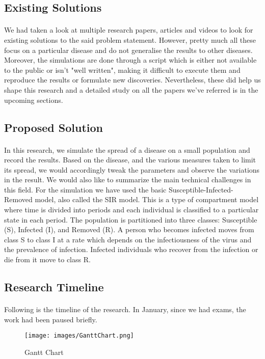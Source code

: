 \documentclass[12pt, a4paper]{extarticle}
\begin{document}
        \subsection{Existing Solutions}
            \paragraph{} We had taken a look at multiple research papers, articles and videos to look for existing solutions to the said problem statement. However, pretty much all these focus on a particular disease and do not generalise the results to other diseases. Moreover, the simulations are done through a script which is either not available to the public or isn't "well written", making it difficult to execute them and reproduce the results or formulate new discoveries. Nevertheless, these did help us shape this research and a detailed study on all the papers we've referred is in the upcoming sections.
        \subsection{Proposed Solution}
            \paragraph{} In this research, we simulate the spread of a disease on a small population and record the results. Based on the disease, and the various measures taken to limit its spread, we would accordingly tweak the parameters and observe the variations in the result. We would also like to summarize the main technical challenges in this field. For the simulation we have used the basic Susceptible-Infected-Removed model, also called the SIR model. This is a type of compartment model where time is divided into periods and each individual is classified to a particular state in each period. The population is partitioned into three classes: Susceptible (S), Infected (I), and Removed (R). A person who becomes infected moves from class S to class I at a rate which depends on the infectiousness of the virus and the prevalence of infection. Infected individuals who recover from the infection or die from it move to class R.
        \subsection{Research Timeline}
            \paragraph{} Following is the timeline of the research. In January, since we had exams, the work had been paused briefly.
            \begin{figure}[!h]
        		\centering
        		\texttt{[image: images/GanttChart.png]}
        		\caption{Gantt Chart}
            \end{figure}
        
\end{document}
